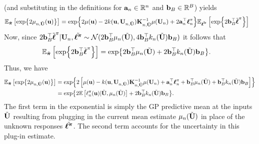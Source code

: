 \documentclass[12pt]{article}
\begin{document}
(and substituting in the definitions for $\ba_{\designIdx} \in \R^{\designIdx}$ and $\bb_{\Nbatch} \in \R^{\Nbatch}$) yields 
\begin{align*}
\E_{\tilde{\boldsymbol{\postDens}}}\left[\Exp{2 \logUnPostMeanPred[\designIdx, \batchMat](\bpar)} \right] 
&= \Exp{2\logUnPostMean(\bpar) - 2\logUnPostKer(\bpar, \designMat[\designIdx, \batchMat]) \KerMat[\designIdx, \batchMat]^{-1} \logUnPostMean(\designMat) + 2\ba_{\designIdx}^\top \logUnPostObs} 
\E_{\tilde{\boldsymbol{\logUnPost}}}\left[\Exp{2\bb_{\Nbatch}^\top \logUnPostBatch} \right] 
\end{align*}
Now, since 
$2\bb_{\Nbatch}^\top \logUnPostBatch | \designMat, \tilde{\boldsymbol{\logUnPost}} \sim 
\Gaussian(2\bb_{\Nbatch}^\top \logUnPostMeanPred(\batchMat), 4\bb_{\Nbatch}^\top \logUnPostKerPred(\batchMat) \bb_{\Nbatch})$ 
it follows that 
\begin{align*}
\E_{\tilde{\boldsymbol{\postDens}}}\left[\Exp{2\bb_{\Nbatch}^\top \logUnPostBatch} \right]
&= \Exp{2\bb_{\Nbatch}^\top \logUnPostMeanPred(\batchMat) + 2\bb_{\Nbatch}^\top \logUnPostKerPred(\batchMat) \bb_{\Nbatch}}.
\end{align*}
Thus, we have 
\begin{align*}
\E_{\tilde{\boldsymbol{\postDens}}}\left[\Exp{2 \logUnPostMeanPred[\designIdx, \batchMat](\bpar)} \right] 
&= \Exp{2\left[\logUnPostMean(\bpar) - \logUnPostKer(\bpar, \designMat[\designIdx, \batchMat]) \KerMat[\designIdx, \batchMat]^{-1} \logUnPostMean(\designMat) + \ba_{\designIdx}^\top \logUnPostObs + \bb_{\Nbatch}^\top \logUnPostMeanPred(\batchMat) + \bb_{\Nbatch}^\top \logUnPostKerPred(\batchMat) \bb_{\Nbatch}\right]} \\
&= \Exp{2 \E\left[\logUnPostPred(\bpar) | \batchMat, \logUnPostMeanPred(\batchMat) \right] + 2\bb_{\Nbatch}^\top \logUnPostKerPred(\batchMat) \bb_{\Nbatch}}.
\end{align*}
The first term in the exponential is simply the GP predictive mean at the inputs $\batchMat$ resulting from plugging in the current mean estimate 
$\logUnPostMeanPred(\batchMat)$ in place of the unknown responses $\tilde{\boldsymbol{\logUnPost}}$. The second term accounts for the uncertainty in this plug-in 
estimate. 
\end{document}
